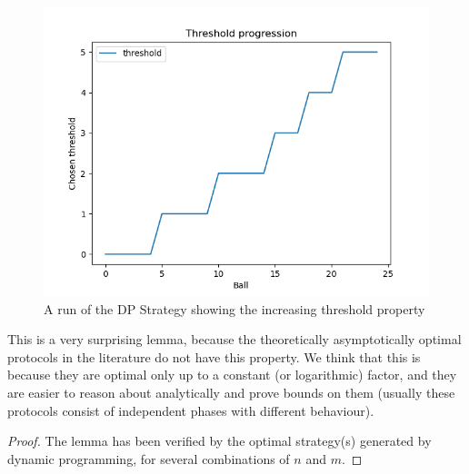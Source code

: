 \begin{figure}[hbt!] \label{dp-increasing-threshold}
    \centering
    \includegraphics[scale=1.0]{Chapter4/Figs/dp_increasing_threshold.png}
    \caption{A run of the DP Strategy showing the increasing threshold property}
\end{figure}
This is a very surprising lemma, because the theoretically asymptotically optimal protocols in the literature do not have this property. We think that this is because they are optimal only up to a constant (or logarithmic) factor, and they are easier to reason about analytically and prove bounds on them (usually these protocols consist of independent phases with different behaviour).


\begin{proof}


The lemma has been verified by the optimal strategy(s) generated by dynamic programming, for several combinations of $n$ and $m$. 
\end{proof}

